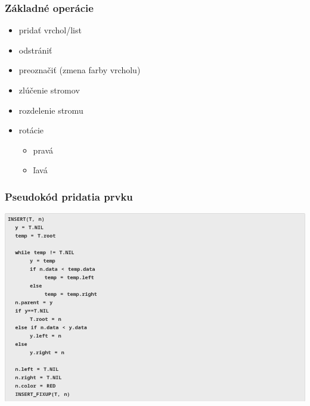 \documentclass{beamer}
\begin{document}
    \begin{frame}
        \frametitle{Základné operácie}
        \begin{itemize}
            \item pridať vrchol/list
            \item odstrániť
            \item preoznačiť {\footnotesize{(zmena farby vrcholu)}}
            \item zlúčenie stromov
            \item rozdelenie stromu
            \item rotácie
            \begin{itemize}
                \item pravá
                \item ľavá
            \end{itemize}
        \end{itemize}
    \end{frame}

    \begin{frame}
        \frametitle{Pseudokód pridatia prvku}
        \includegraphics[width=\textwidth]{pic/in}
    \end{frame}
\end{document}
